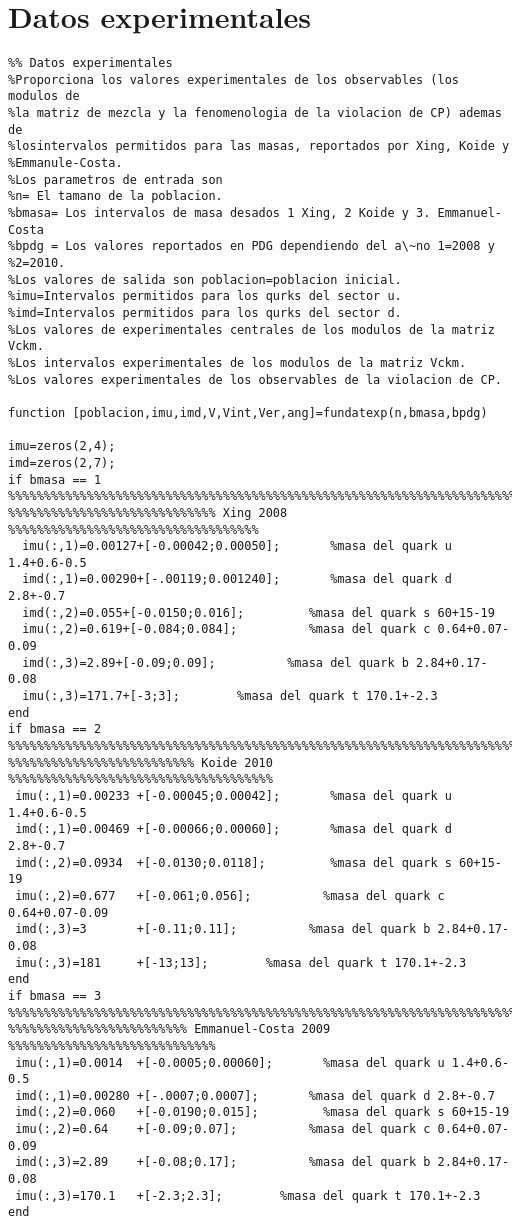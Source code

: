 \section{Datos experimentales}
\begin{verbatim}
%% Datos experimentales
%Proporciona los valores experimentales de los observables (los modulos de 
%la matriz de mezcla y la fenomenologia de la violacion de CP) ademas de
%losintervalos permitidos para las masas, reportados por Xing, Koide y
%Emmanule-Costa. 
%Los parametros de entrada son
%n= El tamano de la poblacion.
%bmasa= Los intervalos de masa desados 1 Xing, 2 Koide y 3. Emmanuel-Costa
%bpdg = Los valores reportados en PDG dependiendo del a\~no 1=2008 y
%2=2010.
%Los valores de salida son poblacion=poblacion inicial.
%imu=Intervalos permitidos para los qurks del sector u.
%imd=Intervalos permitidos para los qurks del sector d.
%Los valores de experimentales centrales de los modulos de la matriz Vckm.
%Los intervalos experimentales de los modulos de la matriz Vckm.
%Los valores experimentales de los observables de la violacion de CP.

function [poblacion,imu,imd,V,Vint,Ver,ang]=fundatexp(n,bmasa,bpdg)

imu=zeros(2,4);
imd=zeros(2,7);
if bmasa == 1
%%%%%%%%%%%%%%%%%%%%%%%%%%%%%%%%%%%%%%%%%%%%%%%%%%%%%%%%%%%%%%%%%%%%%%%%%%%
%%%%%%%%%%%%%%%%%%%%%%%%%%%%% Xing 2008 %%%%%%%%%%%%%%%%%%%%%%%%%%%%%%%%%%%
  imu(:,1)=0.00127+[-0.00042;0.00050];       %masa del quark u 1.4+0.6-0.5
  imd(:,1)=0.00290+[-.00119;0.001240];       %masa del quark d 2.8+-0.7
  imd(:,2)=0.055+[-0.0150;0.016];         %masa del quark s 60+15-19
  imu(:,2)=0.619+[-0.084;0.084];          %masa del quark c 0.64+0.07-0.09
  imd(:,3)=2.89+[-0.09;0.09];          %masa del quark b 2.84+0.17-0.08
  imu(:,3)=171.7+[-3;3];        %masa del quark t 170.1+-2.3
end
if bmasa == 2
%%%%%%%%%%%%%%%%%%%%%%%%%%%%%%%%%%%%%%%%%%%%%%%%%%%%%%%%%%%%%%%%%%%%%%%%%%%
%%%%%%%%%%%%%%%%%%%%%%%%%% Koide 2010 %%%%%%%%%%%%%%%%%%%%%%%%%%%%%%%%%%%%% 
 imu(:,1)=0.00233 +[-0.00045;0.00042];       %masa del quark u 1.4+0.6-0.5
 imd(:,1)=0.00469 +[-0.00066;0.00060];       %masa del quark d 2.8+-0.7
 imd(:,2)=0.0934  +[-0.0130;0.0118];         %masa del quark s 60+15-19
 imu(:,2)=0.677   +[-0.061;0.056];          %masa del quark c 0.64+0.07-0.09
 imd(:,3)=3       +[-0.11;0.11];          %masa del quark b 2.84+0.17-0.08
 imu(:,3)=181     +[-13;13];        %masa del quark t 170.1+-2.3
end
if bmasa == 3
%%%%%%%%%%%%%%%%%%%%%%%%%%%%%%%%%%%%%%%%%%%%%%%%%%%%%%%%%%%%%%%%%%%%%%%%%%%
%%%%%%%%%%%%%%%%%%%%%%%%% Emmanuel-Costa 2009 %%%%%%%%%%%%%%%%%%%%%%%%%%%%%
 imu(:,1)=0.0014  +[-0.0005;0.00060];       %masa del quark u 1.4+0.6-0.5
 imd(:,1)=0.00280 +[-.0007;0.0007];       %masa del quark d 2.8+-0.7
 imd(:,2)=0.060   +[-0.0190;0.015];         %masa del quark s 60+15-19
 imu(:,2)=0.64    +[-0.09;0.07];          %masa del quark c 0.64+0.07-0.09
 imd(:,3)=2.89    +[-0.08;0.17];          %masa del quark b 2.84+0.17-0.08
 imu(:,3)=170.1   +[-2.3;2.3];        %masa del quark t 170.1+-2.3
end


\end{verbatim}
